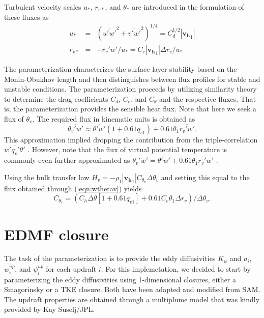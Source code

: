 \documentclass[dvipdfmx,a4paper,10pt]{article}
\begin{document}
Turbulent velocity scales $u_*$, $r_{v*}$, and $\theta_{*}$ are introduced in the formulation of these fluxes as 
\begin{eqnarray}
 u_*&=& (\overline{u'w'}^2+\overline{v'w'}^2)^{1/4} = C_d^{1/2} | \mathbf{v_h}_1 |\\
 r_{v*}&=& -\overline{r_v'w'}/u_*=C_e |\mathbf{v_h}_1| \Delta r_v / u_*\label{eqn:velqv}
\end{eqnarray}

The parameterization characterizes the surface layer stability based on the Monin-Obukhov length and then distinguishes between flux profiles for stable and unstable conditions. The parameterization proceeds by utilizing similarity theory to determine the drag coefficients $C_d$, $C_e$, and $C_{\theta}$ and the respective fluxes. That is, the parameterization provides the sensible heat flux.  Note that here we seek a flux of $\theta_v$. The required flux in kinematic units is obtained as 
\begin{equation}\label{eqn:wthetav}
 \overline{\theta_v'w'}\approx \overline{\theta'w'}(1+0.61q_{v1}) + 0.61 \theta_1  \overline{r_v'w'}.
\end{equation}
This approximation implied dropping the contribution from the triple-correlation $\overline{w'q_v'\theta'}$ \citep[same as in Eq.~(10) in][]{stull94}. However, note that the flux of virtual potential temperature is commonly even further approximated as $\overline{\theta_v'w'}=\overline{\theta'w'}+0.61 \theta_1  \overline{r_v'w'}$ \citep[e.g.,][Eq.~(10.11)]{wyngaard10}. 

Using the bulk transfer law $H_v=-\rho_1|\mathbf{v_h}_1| C_{\theta_v}\Delta \theta_{v}$ and setting this equal to the flux obtained through (\ref{eqn:wthetav}) yields 
\begin{equation}\label{eqn:dragvirtual}
C_{\theta_v}=(C_h\Delta \theta [1+0.61q_{v1}] + 0.61 C_e\theta_1\Delta r_v)/ \Delta \theta_{v}. 
\end{equation}



\section{EDMF closure}\label{sec:closure}

The task of the parameterization is to provide the eddy diffusivities $K_{\psi}$ and $a_i$, $w^{up}_i$, and $\psi^{up}_i$ for each updraft $i$. For this implemetation, we decided to start by parameterizing the eddy diffusivities using 1-dimensional closures, either a Smagorinsky or a TKE closure. Both have been adapted and modified from SAM. The updraft properties are obtained through a multiplume model that was kindly provided by Kay Suselj/JPL.
\end{document}
